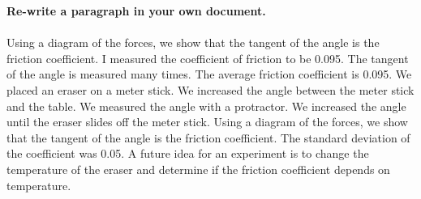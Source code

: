 \documentclass{article}
\begin{document}
\begin{enumerate}
\textbf{Re-write a paragraph in your own document.} \\ \\
Using a diagram of the forces, we show that the tangent of the angle is the friction coefficient.  I measured the coefficient of friction to be 0.095.  The tangent of the angle is measured many times.  The average friction coefficient is 0.095.  We placed an eraser on a meter stick.  We increased the angle between the meter stick and the table.  We measured the angle with a protractor.  We increased the angle until the eraser slides off the meter stick.  Using a diagram of the forces, we show that the tangent of the angle is the friction coefficient.   The standard deviation of the coefficient was 0.05.  A future idea for an experiment is to change the temperature of the eraser and determine if the friction coefficient depends on temperature.
\end{enumerate}
\end{document}
